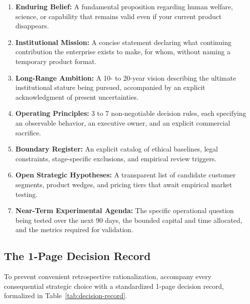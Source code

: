 \begin{enumerate}[leftmargin=12pt,itemsep=2pt,topsep=1pt,parsep=0pt]
  \item \textbf{Enduring Belief:} A fundamental proposition regarding human welfare, science, or capability that remains valid even if your current product disappears.
  \item \textbf{Institutional Mission:} A concise statement declaring what continuing contribution the enterprise exists to make, for whom, without naming a temporary product format.
  \item \textbf{Long-Range Ambition:} A 10- to 20-year vision describing the ultimate institutional stature being pursued, accompanied by an explicit acknowledgment of present uncertainties.
  \item \textbf{Operating Principles:} 3 to 7 non-negotiable decision rules, each specifying an observable behavior, an executive owner, and an explicit commercial sacrifice.
  \item \textbf{Boundary Register:} An explicit catalog of ethical baselines, legal constraints, stage-specific exclusions, and empirical review triggers.
  \item \textbf{Open Strategic Hypotheses:} A transparent list of candidate customer segments, product wedges, and pricing tiers that await empirical market testing.
  \item \textbf{Near-Term Experimental Agenda:} The specific operational question being tested over the next 90 days, the bounded capital and time allocated, and the metrics required for validation.
\end{enumerate}

\subsection{The 1-Page Decision Record}

To prevent convenient retrospective rationalization, accompany every consequential strategic choice with a standardized 1-page decision record, formalized in Table~\ref{tab:decision-record}.

